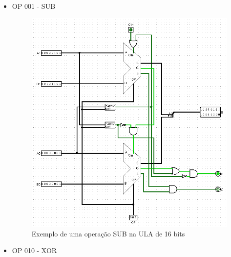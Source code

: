 \documentclass[
	12pt,				%
	openright,			%
	twoside,			%
	a4paper,			%
	english,			%
	french,				%
	spanish,			%
	brazil,				%
	]{abntex2}
\begin{document}
\begin{apendicesenv}
\begin{itemize}
\newpage
\item{OP 001 - SUB}

\begin{figure}[H]
	\begin{center}
	    \includegraphics[scale=0.6]{ULA16SUB.png}
	\end{center}
\caption{\label{ula16sub}Exemplo de uma operação SUB na ULA de 16 bits}
\end{figure}

\newpage
\item{OP 010 - XOR}


\end{itemize}
\end{apendicesenv}
\end{document}
